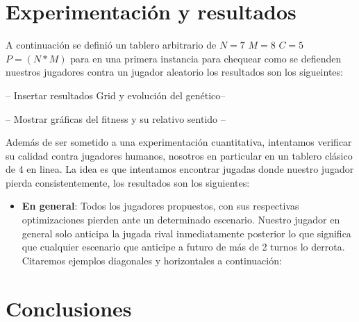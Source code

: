 \documentclass[12pt,a4paper]{article}
\begin{document}
\newpage

		
	
\section{Experimentación y resultados}

A continuación se definió un tablero arbitrario de $N=7$ $M=8$ $C=5$ $P=(N*M)$
para en una primera instancia para chequear como se defienden nuestros jugadores contra un jugador aleatorio los resultados son los sigueintes:

-- Insertar resultados Grid y evolución del genético--

-- Mostrar gráficas del fitness y su relativo sentido --

Además de ser sometido a una experimentación cuantitativa, intentamos verificar su calidad contra jugadores humanos, nosotros en particular en un tablero clásico de 4 en linea. La idea es que intentamos encontrar jugadas donde nuestro jugador pierda consistentemente, los resultados son los siguientes:

\begin{itemize}
            \item \textbf{En general}: Todos los jugadores propuestos, con sus respectivas optimizaciones pierden ante un determinado escenario. Nuestro jugador en general solo anticipa la jugada rival inmediatamente posterior lo que significa que cualquier escenario que anticipe a futuro de más de 2 turnos lo derrota. Citaremos ejemplos diagonales y horizontales a continuación:
            
            
            
            
            
\end{itemize}




\newpage



\section{Conclusiones}









\end{document}

